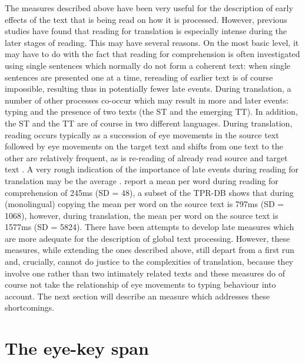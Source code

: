 \documentclass[output=paper]{LSP/langsci}
\begin{document}
\largerpage
The  measures described above have been very useful for the description of early effects of the text that is being read on how it is processed. However, previous studies \citep[e.g.][]{Jakobsen2008a,Schaeffer2016Word} have found that reading for translation is especially intense during the later stages of reading. This may have several reasons. On the most basic level, it may have to do with the fact that reading for comprehension is often investigated using single sentences which normally do not form a coherent text: when single sentences are presented one at a time, rereading of earlier text is of course impossible, resulting thus in potentially fewer late  events. During translation, a number of other processes co-occur which may result in more and later  events: typing and the presence of two texts (the ST and the emerging TT). In addition, the ST and the TT are of course in two different languages. During translation, reading occurs typically as a succession of eye movements in the source text followed by eye movements on the target text and shifts from one text to the other are relatively frequent, as is re-reading of already read source and target text \citep[e.g.][]{Jakobsen2008a, Jensen2011a}. A very rough indication of the importance of late events during reading for translation may be the average . \citet{Kliegl2004} report a mean  per word during reading for comprehension of 245ms (SD = 48), a subset of the TPR-DB shows that during (monolingual) copying the mean  per word on the source text is 797ms (SD = 1068), however, during translation, the mean  per word on the source text is 1577ms (SD = 5824). There have been attempts \citep{Hyona2003} to develop late  measures which are more adequate for the description of global text processing. However, these  measures, while extending the ones described above, still depart from a first run and, crucially, cannot do justice to the complexities of translation, because they involve one rather than two intimately related texts and these measures do of course not take the relationship of eye movements to typing behaviour into account. The next section will describe an  measure which addresses these shortcomings.

\section{The eye-key span}
\end{document}
